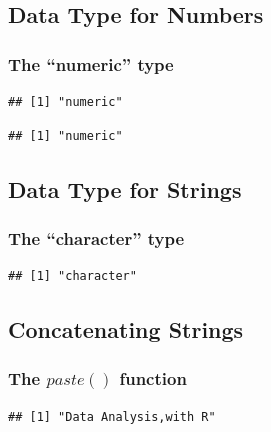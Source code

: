 \documentclass[12pt]{book}\usepackage{knitr}
\begin{document}
\subsection{Data Type for Numbers}
\subsubsection{The ``numeric'' type}
\begin{knitrout}
\color{fgcolor}\begin{kframe}
\begin{alltt}
\hlstd{(}\hlstd{)}
\end{alltt}
\begin{verbatim}
## [1] "numeric"
\end{verbatim}
\begin{alltt}
\hlstd{(}\hlstd{)}
\end{alltt}
\begin{verbatim}
## [1] "numeric"
\end{verbatim}
\end{kframe}
\end{knitrout}
\subsection{Data Type for Strings}
\subsubsection{The ``character'' type}
\begin{knitrout}
\color{fgcolor}\begin{kframe}
\begin{alltt}
\hlstd{(}\hlstd{)}
\end{alltt}
\begin{verbatim}
## [1] "character"
\end{verbatim}
\end{kframe}
\end{knitrout}
\subsection{Concatenating Strings}
\subsubsection{The $paste()$ function}
\begin{knitrout}
\color{fgcolor}\begin{kframe}
\begin{alltt}
\hlstd{(}\hlstd{,}\hlstd{,}\hlstd{=}\hlstd{)}
\end{alltt}
\begin{verbatim}
## [1] "Data Analysis,with R"
\end{verbatim}
\end{kframe}
\end{knitrout}
\end{document}
